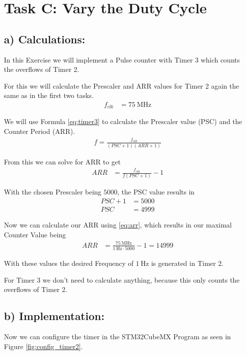 \section{Task C: Vary the Duty Cycle}

\subsection{a) Calculations:}
In this Exercise we will implement a Pulse counter with Timer 3 which counts the overflows of Timer 2.

For this we will calculate the Prescaler and ARR values for Timer 2 again the same as in the first two tasks.
\begin{align}
	f_{clk} &= \SI{75}{\mega\hertz}
\end{align}

We will use Formula \ref{eq:timer3} to calculate the Prescaler value (PSC) and the Counter Period (ARR).
\begin{align}\label{eq:timer3}
	f = \frac{f_{clk}}{(PSC + 1)(ARR + 1)}
\end{align}

From this we can solve for ARR to get
\begin{align}\label{eq:arr}
	ARR &= \frac{f_{clk}}{f(PSC + 1)} - 1
\end{align}

With the chosen Prescaler being $5000$, the PSC value results in 
\begin{align}
	PSC + 1 &= 5000 \\
	PSC &= 4999
\end{align}

Now we can calculate our ARR using \ref{eq:arr}, which results in our maximal Counter Value being 
\begin{align}
	ARR &= \frac{\SI{75}{\mega\hertz}}{\SI{1}{\hertz} \cdot \num{5000}} - 1 = \num{14999}
\end{align}

With these values the desired Frequency of $\SI{1}{\hertz}$ is generated in Timer 2.

For Timer 3 we don't need to calculate anything, because this only counts the overflows of Timer 2.

\subsection{b) Implementation:}
Now we can configure the timer in the STM32CubeMX Program as seen in Figure \ref{fig:config_timer2}.

